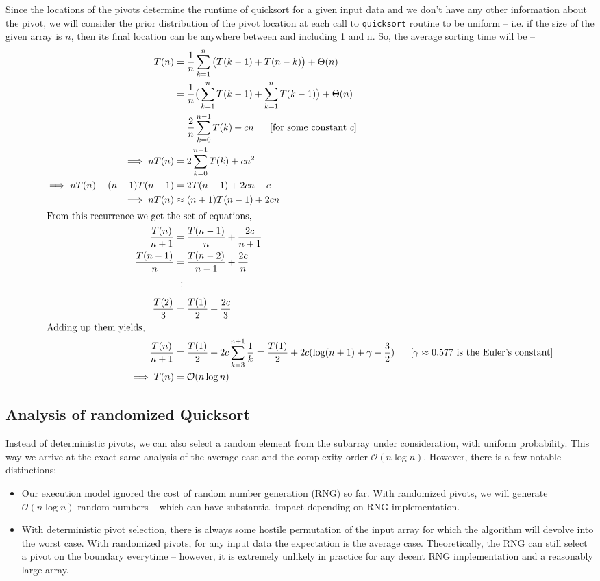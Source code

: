 \documentclass[]{finalproject}
\begin{document}
Since the locations of the pivots determine the runtime of quicksort for a given input data and we don't have any other information about the pivot, we will consider the prior distribution of the pivot location at each call to \texttt{quicksort} routine to be uniform -- i.e. if the size of the given array is $n$, then its final location can be anywhere between and including 1 and n. So, the average sorting time will be --
\begin{align*}
T(n) &= \frac{1}{n}\sum_{k=1}^{n}\big(T(k-1) + T(n-k)\big) + \Theta(n) \\
&= \frac{1}{n}\big(\sum_{k=1}^{n}T(k-1) + \sum_{k=1}^{n}T(k-1)\big) + \Theta(n) \\
&= \frac{2}{n}\sum_{k=0}^{n-1}T(k) + cn ~~~~~[\text{for some constant $c$}]\\
\implies nT(n) &= 2\sum_{k=0}^{n-1}T(k) + cn^2 \\
\implies nT(n) - (n-1)T(n-1) &= 2T(n-1) + 2cn - c \\
\implies nT(n) &\approx (n+1)T(n-1) + 2cn \\
\shortintertext{From this recurrence we get the set of equations,}
\frac{T(n)}{n+1} &= \frac{T(n-1)}{n} + \frac{2c}{n+1} \\
\frac{T(n-1)}{n} &= \frac{T(n-2)}{n-1} + \frac{2c}{n} \\
&~~\vdots \\
\frac{T(2)}{3} &= \frac{T(1)}{2} + \frac{2c}{3} \\
\shortintertext{Adding up them yields,}
\frac{T(n)}{n+1} &=  \frac{T(1)}{2} + 2c \sum_{k=3}^{n+1}\frac{1}{k} = \frac{T(1)}{2} + 2c(\log(n+1) + \gamma - \frac{3}{2}) ~~~~~[\text{$\gamma \approx 0.577$ is the Euler's constant}] \\
\implies T(n) &= \mathcal{O}(n\log n)
\end{align*}

\subsection{Analysis of randomized Quicksort}

Instead of deterministic pivots, we can also select a random element from the subarray under consideration, with uniform probability. This way we arrive at the exact same analysis of the average case and the complexity order $\mathcal{O}(n\log n)$. However, there is a few notable distinctions:
\begin{itemize}
\item Our execution model ignored the cost of random number generation (RNG) so far. With randomized pivots, we will generate $\mathcal{O}(n\log n)$ random numbers -- which can have substantial impact depending on RNG implementation.
\item With deterministic pivot selection, there is always some hostile permutation of the input array for which the algorithm will devolve into the worst case. With randomized pivots, for any input data the expectation is the average case. Theoretically, the RNG can still select a pivot on the boundary everytime -- however, it is extremely unlikely in practice for any decent RNG implementation and a reasonably large array.
\end{itemize}
\end{document}

